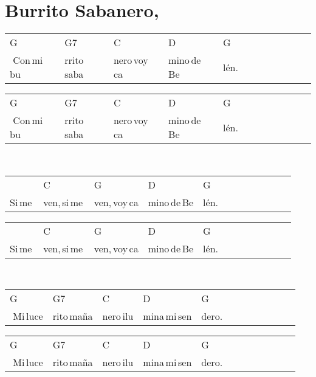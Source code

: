 \section*{Burrito Sabanero, \hfill}
\begin{multicols}{2}
\noindent
\begin{minipage}{\columnwidth}
\noindent
\noindent
\begin{tabular}{llllllllllll}
G&G7&C&D&G\\
\,\,Con\,mi\,bu&rrito\,saba&nero\,voy\,ca&mino\,de\,Be&lén.
\end{tabular}

\noindent
\begin{tabular}{llllllllllll}
G&G7&C&D&G\\
\,\,Con\,mi\,bu&rrito\,saba&nero\,voy\,ca&mino\,de\,Be&lén.
\end{tabular}
\end{minipage}\\

\noindent
\begin{minipage}{\columnwidth}
\noindent
\noindent
\begin{tabular}{llllllllllll}
&C&G&D&G\\
Si\,me\,&ven,\,si\,me\,&ven,\,voy\,ca&mino\,de\,Be&lén.
\end{tabular}

\noindent
\begin{tabular}{llllllllllll}
&C&G&D&G\\
Si\,me\,&ven,\,si\,me\,&ven,\,voy\,ca&mino\,de\,Be&lén.
\end{tabular}
\end{minipage}\\

\noindent
\begin{minipage}{\columnwidth}
\noindent
\noindent
\begin{tabular}{llllllllllll}
G&G7&C&D&G\\
\,\,Mi\,luce&rito\,maña&nero\,ilu&mina\,mi\,sen&dero.
\end{tabular}

\noindent
\begin{tabular}{llllllllllll}
G&G7&C&D&G\\
\,\,Mi\,luce&rito\,maña&nero\,ilu&mina\,mi\,sen&dero.
\end{tabular}
\end{minipage}\\


\chorus{}


\end{multicols}
